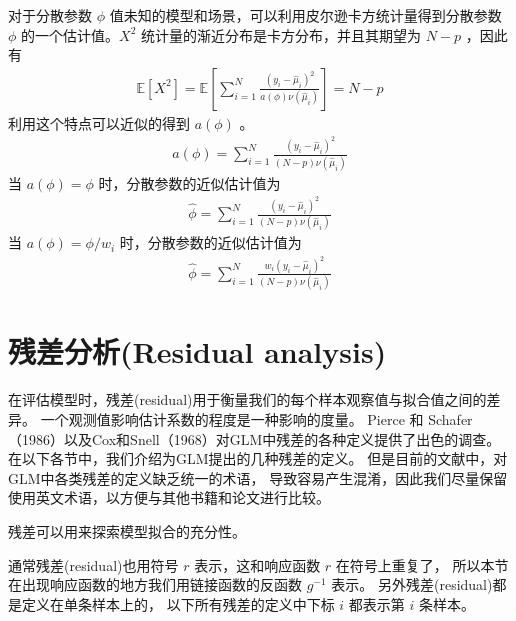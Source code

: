 \documentclass[letterpaper,10pt,english]{sphinxmanual}
\begin{document}
对于分散参数 \(\phi\) 值未知的模型和场景，可以利用皮尔逊卡方统计量得到分散参数 \(\phi\)
的一个估计值。\(X^2\) 统计量的渐近分布是卡方分布，并且其期望为 \(N-p\)
，因此有
\begin{equation}\label{equation:模型评估/content:模型评估/content:22}
\begin{split}\mathbb{E}[X^2] = \mathbb{E} \left [
    \sum_{i=1}^N  \frac{(y_i-\hat{\mu}_i)^2}{a(\phi)\nu(\hat{\mu}_i)}
\right ] = N-p\end{split}
\end{equation}
利用这个特点可以近似的得到 \(a(\phi)\) 。
\begin{equation}\label{equation:模型评估/content:模型评估/content:23}
\begin{split}a(\phi) = \sum_{i=1}^N  \frac{(y_i-\hat{\mu}_i)^2}{(N-p)\nu(\hat{\mu}_i)}\end{split}
\end{equation}
当 \(a(\phi)=\phi\) 时，分散参数的近似估计值为
\begin{equation}\label{equation:模型评估/content:模型评估/content:24}
\begin{split}\hat{\phi} = \sum_{i=1}^N  \frac{(y_i-\hat{\mu}_i)^2}{(N-p)\nu(\hat{\mu}_i)}\end{split}
\end{equation}
当 \(a(\phi)=\phi / w_i\) 时，分散参数的近似估计值为
\begin{equation}\label{equation:模型评估/content:模型评估/content:25}
\begin{split}\hat{\phi} = \sum_{i=1}^N  \frac{ w_i (y_i-\hat{\mu}_i)^2}{(N-p)\nu(\hat{\mu}_i)}\end{split}
\end{equation}

\section{残差分析(Residual analysis)}
\label{\detokenize{_u6a21_u578b_u8bc4_u4f30/content:residual-analysis}}
在评估模型时，残差(residual)用于衡量我们的每个样本观察值与拟合值之间的差异。
一个观测值影响估计系数的程度是一种影响的度量。
Pierce 和 Schafer（1986）以及Cox和Snell（1968）对GLM中残差的各种定义提供了出色的调查。
在以下各节中，我们介绍为GLM提出的几种残差的定义。
但是目前的文献中，对GLM中各类残差的定义缺乏统一的术语，
导致容易产生混淆，因此我们尽量保留使用英文术语，以方便与其他书籍和论文进行比较。

残差可以用来探索模型拟合的充分性。

通常残差(residual)也用符号 \(r\) 表示，这和响应函数 \(r\) 在符号上重复了，
所以本节在出现响应函数的地方我们用链接函数的反函数 \(g^{-1}\) 表示。
另外残差(residual)都是定义在单条样本上的，
以下所有残差的定义中下标 \(i\) 都表示第 \(i\) 条样本。
\end{document}
